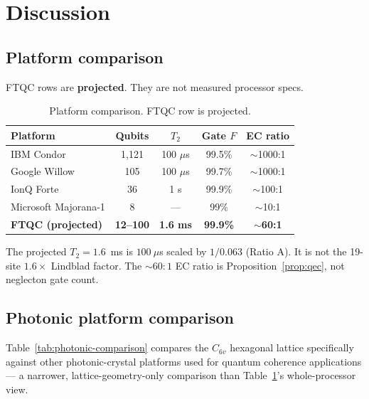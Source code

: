 \documentclass[aps,prx,twocolumn,superscriptaddress,floatfix]{revtex4-2}
\theoremstyle{plain}
\theoremstyle{definition}
\begin{document}
\section{Discussion}
\label{sec:discussion}

\subsection{Platform comparison}

FTQC rows are \textbf{projected}. They are not measured processor specs.

\begin{table}[h]
\caption{Platform comparison. FTQC row is projected.}
\label{tab:comparison}
\begin{ruledtabular}
\begin{tabular}{lcccc}
Platform & Qubits & $T_2$ & Gate $F$ & EC ratio \\
\hline
IBM Condor & 1,121 & 100 $\mu$s & 99.5\% & $\sim$1000:1 \\
Google Willow & 105 & 100 $\mu$s & 99.7\% & $\sim$1000:1 \\
IonQ Forte & 36 & 1 s & 99.9\% & $\sim$100:1 \\
Microsoft Majorana-1 & 8 & --- & 99\% & $\sim$10:1 \\
\textbf{FTQC (projected)} & \textbf{12--100} & \textbf{1.6 ms} & \textbf{99.9\%} & \textbf{$\sim$60:1} \\
\end{tabular}
\end{ruledtabular}
\end{table}

The projected $T_2=1.6$~ms is $100~\mu$s scaled by $1/0.063$ (Ratio A). It is not the 19-site $1.6\times$ Lindblad factor. The $\sim 60:1$ EC ratio is Proposition~\ref{prop:qec}, not neglecton gate count.

\subsection{Photonic platform comparison}

Table~\ref{tab:photonic-comparison} compares the $C_{6v}$ hexagonal lattice specifically against other photonic-crystal platforms used for quantum coherence applications --- a narrower, lattice-geometry-only comparison than Table~\ref{tab:comparison}'s whole-processor view.
\end{document}
